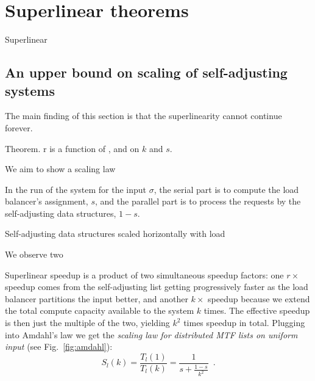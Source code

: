 \appendix


\section{Superlinear theorems}

\begin{theorem}
	\label{thm:superlinear}
	Superlinear
\end{theorem}

\begin{observation}
	\label{obs:list}
\end{observation}


\subsection{An upper bound on scaling of self-adjusting systems}


The main finding of this section is that the superlinearity cannot continue forever.


Theorem. r is a function of , and on $k$ and $s$.


We aim to show a scaling law 



In the run of the system for the input $\sigma$, the serial part is to compute the load balancer's assignment, $s$, and the parallel part is to process the requests by the self-adjusting data structures, $1-s$.






Self-adjusting data structures scaled horizontally with load 



We observe two 



Superlinear speedup is a product of two simultaneous speedup factors: one $r\times$ speedup comes from the self-adjusting list getting progressively faster as the load balancer partitions the input better, and another $k\times$ speedup because we extend the total compute capacity available to the system $k$ times. The effective speedup is then just the multiple of the two, yielding $k^2$ times speedup in total. Plugging into Amdahl's law we get the \emph{scaling law for distributed MTF lists on uniform input} (see Fig.~\ref{fig:amdahl}):
\begin{equation}\label{eq:mtf-perf}
  S_l(k) = \frac{T_l(1)}{T_l(k)} = \frac1{s + \frac{1-s}{k^2}} \enspace .
\end{equation}






